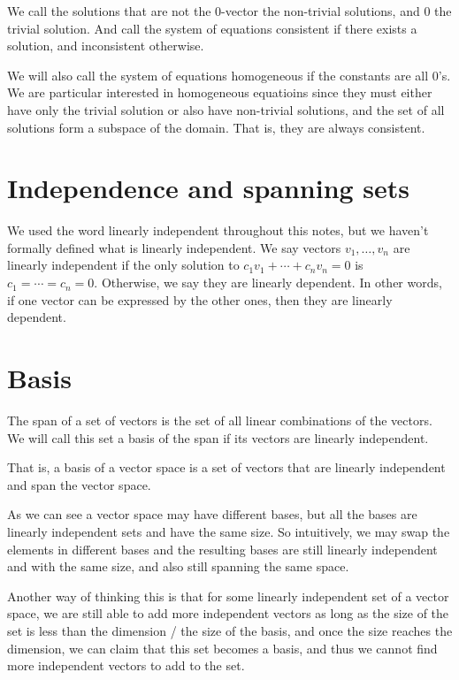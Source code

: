 \documentclass[11pt, cyan, night, 1in]{LatexTemplate/hw}
\begin{document}
We call the solutions that are not the 0-vector the non-trivial solutions, and 0 the trivial solution. And call the system of equations consistent if there exists a solution, and inconsistent otherwise.

We will also call the system of equations homogeneous if the constants are all 0's. We are particular interested in homogeneous equatioins since they must either have only the trivial solution or also have non-trivial solutions, and the set of all solutions form a subspace of the domain. That is, they are always consistent.

\section{Independence and spanning sets}

We used the word linearly independent throughout this notes, but we haven't formally defined what is linearly independent. We say vectors $v_1,\dots,v_n$ are linearly independent if the only solution to $c_1v_1+\cdots+c_nv_n=0$ is $c_1=\cdots=c_n=0$. Otherwise, we say they are linearly dependent. In other words, if one vector can be expressed by the other ones, then they are linearly dependent.

\section{Basis}

The span of a set of vectors is the set of all linear combinations of the vectors. We will call this set a basis of the span if its vectors are linearly independent.

That is, a basis of a vector space is a set of vectors that are linearly independent and span the vector space.

As we can see a vector space may have different bases, but all the bases are linearly independent sets and have the same size. So intuitively, we may swap the elements in different bases and the resulting bases are still linearly independent and with the same size, and also still spanning the same space. 

Another way of thinking this is that for some linearly independent set of a vector space, we are still able to add more independent vectors as long as the size of the set is less than the dimension / the size of the basis, and once the size reaches the dimension, we can claim that this set becomes a basis, and thus we cannot find more independent vectors to add to the set.
\end{document}

